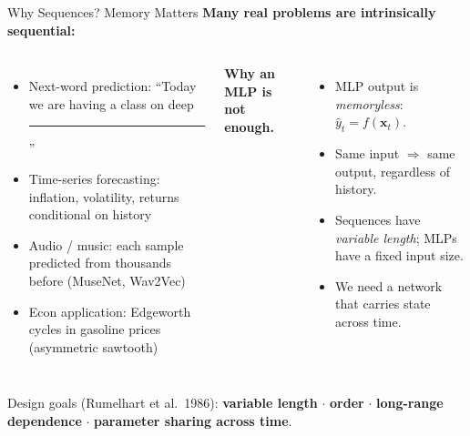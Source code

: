\documentclass[aspectratio=169,11pt]{beamer}
\newcommand{\emphc}[1]{\textcolor{harvardcrimson}{#1}}
\newcommand{\x}{\bm{x}}
\begin{document}

\begin{frame}{Why Sequences? Memory Matters}
\footnotesize
\textbf{Many real problems are intrinsically sequential:}
\begin{columns}[T]
\begin{itemize}\itemsep1pt
    \item \emphc{Next-word prediction:} ``Today we are having a class on deep \rule{0.9cm}{0.4pt}''
    \item \emphc{Time-series forecasting:} inflation, volatility, returns conditional on history
    \item \emphc{Audio / music:} each sample predicted from thousands before (MuseNet, Wav2Vec)
    \item \emphc{Econ application:} Edgeworth cycles in gasoline prices (asymmetric sawtooth)
\end{itemize}

\textbf{Why an MLP is not enough.}
\begin{itemize}\itemsep1pt
    \item MLP output is \emph{memoryless}: $\hat{y}_t = f(\x_t)$.
    \item Same input $\Rightarrow$ same output, regardless of history.
    \item Sequences have \emph{variable length}; MLPs have a fixed input size.
    \item We need a network that \emphc{carries state across time}.
\end{itemize}
\end{columns}

\vspace{5pt}
\begin{center}
\small
\emphc{Design goals} (Rumelhart et al.\ 1986): \textbf{variable length} $\cdot$ \textbf{order} $\cdot$ \textbf{long-range dependence} $\cdot$ \textbf{parameter sharing across time}.
\end{center}
\end{frame}
\end{document}
